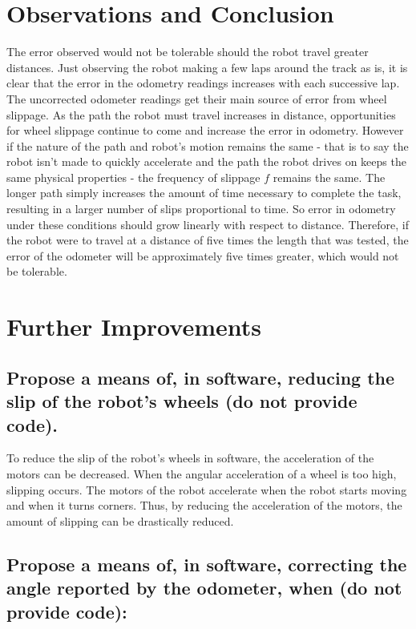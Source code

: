\documentclass[11pt]{article} %
\begin{document}
\section{Observations and Conclusion}
The error observed would not be tolerable should the robot travel greater distances. Just observing
the robot making a few laps around the track as is, it is clear that the error in the odometry
readings increases with each successive lap. The uncorrected odometer readings get their main source
of error from wheel slippage. As the path the robot must travel increases in distance, opportunities
for wheel slippage continue to come and increase the error in odometry. However if the nature of the
path and robot's motion remains the same - that is to say the robot isn't made to quickly accelerate
and the path the robot drives on keeps the same physical properties - the frequency of slippage $f$
remains the same. The longer path simply increases the amount of time necessary to complete the
task, resulting in a larger number of slips proportional to time. So error in odometry under these
conditions should grow linearly with respect to distance. Therefore, if the robot were to travel at
a distance of five times the length that was tested, the error of the odometer will be approximately
five times greater, which would not be tolerable.
\section{Further Improvements}
\subsection{Propose a means of, in software, reducing the slip of the robot's wheels (do not provide code).}
To reduce the slip of the robot's wheels in software, the acceleration of the motors can be
decreased. When the angular acceleration of a wheel is too high, slipping occurs. The motors of the
robot accelerate when the robot starts moving and when it turns corners. Thus, by reducing
the acceleration of the motors, the amount of slipping can be drastically reduced.
\subsection{Propose a means of, in software, correcting the angle reported by the odometer, when (do not provide code):}
\end{document}
